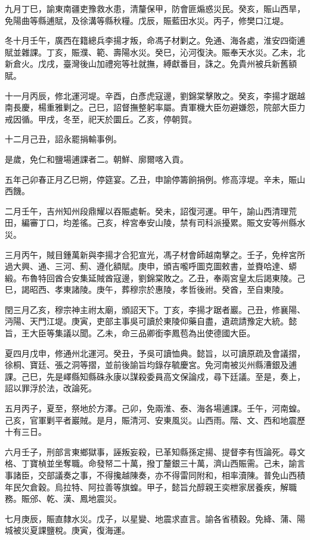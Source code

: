 \begin{pinyinscope}
九月丁巳，諭東南疆吏豫救水患，清釐保甲，防會匪煽惑災民。癸亥，賑山西旱，免陽曲等縣逋賦，及徐溝等縣秋糧。戊辰，賑藍田水災。丙子，修樊口江堤。

冬十月壬午，廣西在籍總兵李揚才叛，命馮子材剿之。免通、海各處，淮安四衛逋賦並雜課。丁亥，賑濮、範、壽陽水災。癸巳，沁河復決。賑奉天水災。乙未，北新倉火。戊戌，臺灣後山加禮宛等社就撫，縛獻番目，誅之。免貴州被兵新舊額賦。

十一月丙辰，修北運河堤。辛酉，白彥虎寇邊，劉錦棠擊敗之。癸亥，李揚才踞越南長慶，楊重雅剿之。己巳，詔督撫整躬率屬。責軍機大臣勿避嫌怨，院部大臣力戒因循。甲戌，冬至，祀天於圜丘。乙亥，停朝賀。

十二月己丑，詔永罷捐輸事例。

是歲，免仁和鹽場逋課者二。朝鮮、廓爾喀入貢。

五年己卯春正月乙巳朔，停筵宴。乙丑，申諭停籌餉捐例。修高淳堤。辛未，賑山西饑。

二月壬午，吉州知州段鼎耀以吞賑處斬。癸未，詔復河運。甲午，諭山西清理荒田，編審丁口，均差徭。己亥，梓宮奉安山陵，禁有司科派擾累。賑文安等州縣水災。

三月丙午，賊目鍾萬新與李揚才合犯宣光，馮子材會師越南擊之。壬子，免梓宮所過大興、通、三河、薊、遵化額賦。庚申，頒吉嚨呼圖克圖敕書，並賚哈達、蟒緞。布魯特回酋合安集延賊酋寇邊，劉錦棠敗之。乙丑，奉兩宮皇太后謁東陵。己巳，謁昭西、孝東諸陵。庚午，葬穆宗於惠陵，孝哲後祔。癸酋，至自東陵。

閏三月乙亥，穆宗神主祔太廟，頒詔天下。丁亥，李揚才踞者巖。己丑，修襄陽、沔陽、天門江堤。庚寅，吏部主事吳可讀於東陵仰藥自盡，遺疏請豫定大統。懿旨，王大臣等集議以聞。乙未，命三品卿銜李鳳苞為出使德國大臣。

夏四月戊申，修通州北運河。癸丑，予吳可讀恤典。懿旨，以可讀原疏及會議摺，徐桐、寶廷、張之洞等摺，並前後諭旨均錄存毓慶宮。免河南被災州縣漕銀及逋課。己巳，先是嶧縣知縣硃永康以謀殺委員高文保論戍，尋下廷議。至是，奏上，詔以罪浮於法，改論死。

五月丙子，夏至，祭地於方澤。己卯，免兩淮、泰、海各場逋課。壬午，河南蝗。己亥，官軍剿平者巖賊。是月，賑清河、安東風災。山西雨。階、文、西和地震歷十有三日。

六月壬子，刑部言東鄉獄事，誣叛妄殺，已革知縣孫定揚、提督李有恆論死。尋文格、丁寶楨並坐奪職。命發帑二十萬，撥丁釐銀三十萬，濟山西賑需。己未，諭言事諸臣，交部議奏之事，不得攙越陳奏，亦不得雷同附和，相率瀆陳。普免山西積年民欠倉穀。烏拉特、阿拉善等旗蝗。甲子，懿旨允醇親王奕枻家居養疾，解職務。賑邠、乾、漢、鳳地震災。

七月庚辰，賑直隸水災。戊子，以星變、地震求直言。諭各省積穀。免絳、蒲、陽城被災夏課鹽稅。庚寅，復海運。


\end{pinyinscope}
